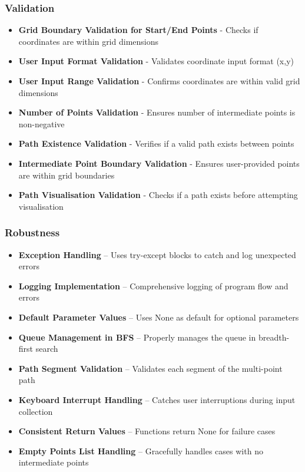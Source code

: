\subsubsection{Validation}
    \begin{itemize}
    \item \textbf{Grid Boundary Validation for Start/End Points} - Checks if coordinates are within grid dimensions
    \item \textbf{User Input Format Validation} - Validates coordinate input format (x,y)
    \item \textbf{User Input Range Validation} - Confirms coordinates are within valid grid dimensions
    \item \textbf{Number of Points Validation} - Ensures number of intermediate points is non-negative
    \item \textbf{Path Existence Validation} - Verifies if a valid path exists between points
    \item \textbf{Intermediate Point Boundary Validation} - Ensures user-provided points are within grid boundaries
    \item \textbf{Path Visualisation Validation} - Checks if a path exists before attempting visualisation
\end{itemize}

\subsubsection{Robustness}
\begin{itemize}
    \item \textbf{Exception Handling} -- Uses try-except blocks to catch and log unexpected errors
    \item \textbf{Logging Implementation} -- Comprehensive logging of program flow and errors
    \item \textbf{Default Parameter Values} -- Uses None as default for optional parameters
    \item \textbf{Queue Management in BFS} -- Properly manages the queue in breadth-first search
    \item \textbf{Path Segment Validation} -- Validates each segment of the multi-point path
    \item \textbf{Keyboard Interrupt Handling} -- Catches user interruptions during input collection
    \item \textbf{Consistent Return Values} -- Functions return None for failure cases
    \item \textbf{Empty Points List Handling} -- Gracefully handles cases with no intermediate points
\end{itemize}

